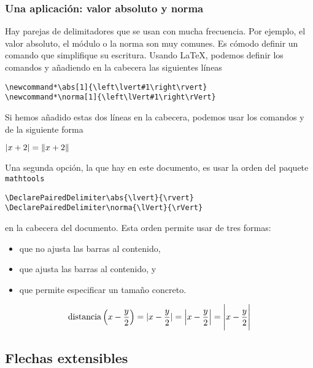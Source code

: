 \documentclass{article}
\numberwithin{equation}{section}
\DeclareMathOperator{\dist}{distancia}
\DeclarePairedDelimiter\abs{\lvert}{\rvert}
\DeclarePairedDelimiter\norma{\lVert}{\rVert}
\theoremstyle{plain}
\theoremstyle{definition}
\theoremstyle{remark}
\begin{document}
\subsubsection{Una aplicación: valor absoluto y norma}

Hay parejas de delimitadores que se usan con mucha frecuencia. Por ejemplo, el valor absoluto, el módulo o la norma son muy comunes. Es cómodo definir un comando que simplifique su escritura. Usando \LaTeX{}, podemos definir los comandos \texttt{\abs} y \texttt{\norma} añadiendo en la cabecera las siguientes líneas
\begin{verbatim}
\newcommand*\abs[1]{\left\lvert#1\right\rvert}
\newcommand*\norma[1]{\left\lVert#1\right\rVert}
\end{verbatim}
Si hemos añadido estas dos líneas en la cabecera, podemos usar los comandos \texttt{\abs} y \texttt{\norma} de la siguiente forma
\begin{codigo-lado}
$\abs{x+2} = \norma{x+2}$
\end{codigo-lado}


Una segunda opción, la que hay en este documento, es usar la orden \texttt{\DeclarePairedDelimiter} del paquete \texttt{mathtools}
\begin{verbatim}
\DeclarePairedDelimiter\abs{\lvert}{\rvert}
\DeclarePairedDelimiter\norma{\lVert}{\rVert}
\end{verbatim}
en la cabecera del documento. Esta orden permite usar \texttt{\abs} de tres formas:
\begin{itemize}
	\item \texttt{} que no ajusta las barras al contenido,
	\item \texttt{} que ajusta las barras al contenido, y
	\item \texttt{} que permite especificar un tamaño concreto.
\end{itemize}
\begin{codigo-arriba}
	\[\dist \left(x-\frac{y}{2} \right)
	=\abs{x-\frac{y}{2}}
	=\abs*{x-\frac{y}{2}}
	=\abs[\Bigg]{x-\frac{y}{2}}\]
\end{codigo-arriba}



\subsection{Flechas extensibles}
\end{document}
